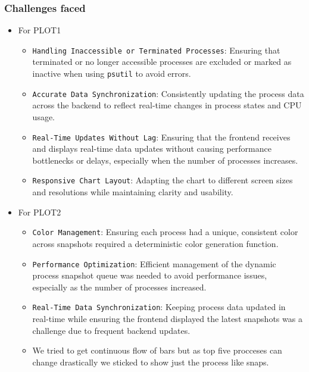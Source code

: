 \documentclass[12pt]{article}
\begin{document}
\subsubsection{Challenges faced}
\begin{itemize}
    \item For PLOT1
    \begin{itemize}
      
        \item \texttt{Handling Inaccessible or Terminated Processes}: Ensuring that terminated or no longer accessible processes are excluded or marked as inactive when using \texttt{psutil} to avoid errors.
        
        \item \texttt{Accurate Data Synchronization}: Consistently updating the process data across the backend to reflect real-time changes in process states and CPU usage.
        
        \item \texttt{Real-Time Updates Without Lag}: Ensuring that the frontend receives and displays real-time data updates without causing performance bottlenecks or delays, especially when the number of processes increases.
        
        \item \texttt{Responsive Chart Layout}: Adapting the chart to different screen sizes and resolutions while maintaining clarity and usability.

    \end{itemize}
    \item For PLOT2
    \begin{itemize}
        \item \texttt{Color Management}: Ensuring each process had a unique, consistent color across snapshots required a deterministic color generation function.
        
        \item \texttt{Performance Optimization}: Efficient management of the dynamic process snapshot queue was needed to avoid performance issues, especially as the number of processes increased.
        
        \item \texttt{Real-Time Data Synchronization}: Keeping process data updated in real-time while ensuring the frontend displayed the latest snapshots was a challenge due to frequent backend updates.
        
        \item We tried to get continuous flow of bars but as top five procceses can change drastically we sticked to show just the process like snaps.

    \end{itemize}

\end{itemize}
\end{document}
